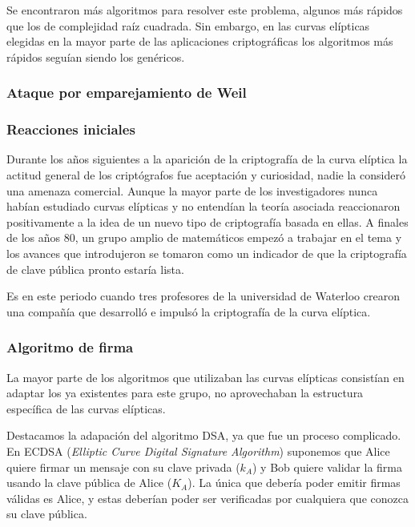 \documentclass[
  a4paper,
  12pt,
  spanish,
]{scrartcl}
\begin{document}
Se encontraron más algoritmos para resolver este problema, algunos más rápidos que los de complejidad raíz cuadrada. Sin embargo, en las curvas elípticas elegidas en la mayor parte de las aplicaciones criptográficas los algoritmos más rápidos seguían siendo los genéricos.

\subsubsection{Ataque por emparejamiento de Weil}



\subsubsection{Reacciones iniciales}
Durante los años siguientes a la aparición de la criptografía de la curva elíptica la actitud general de los criptógrafos fue aceptación y curiosidad, nadie la consideró una amenaza comercial. Aunque la mayor parte de los investigadores nunca habían estudiado curvas elípticas y no entendían la teoría asociada reaccionaron positivamente a la idea de un nuevo tipo de criptografía basada en ellas. A finales de los años 80, un grupo amplio de matemáticos empezó a trabajar en el tema y los avances que introdujeron se tomaron como un indicador de que la criptografía de clave pública pronto estaría lista.

Es en este periodo cuando tres profesores de la universidad de Waterloo crearon una compañía que desarrolló e impulsó la criptografía de la curva elíptica. 


\subsubsection{Algoritmo de firma}

La mayor parte de los algoritmos que utilizaban las curvas elípticas consistían en adaptar los ya existentes para este grupo, no aprovechaban la estructura específica de las curvas elípticas.

Destacamos la adapación del algoritmo DSA, ya que fue un proceso complicado. En ECDSA (\textit{Elliptic Curve Digital Signature Algorithm}) suponemos que Alice quiere firmar un mensaje con su clave privada ($k_A$) y Bob quiere validar la firma usando la clave pública de Alice ($K_A$). La única que debería poder emitir firmas válidas es Alice, y estas deberían poder ser verificadas por cualquiera que conozca su clave pública.
\end{document}
